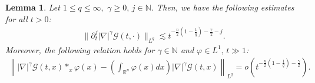 \documentclass[11pt,reqno]{amsart}
\newtheorem{lemma}{Lemma}[section]
\begin{document}
\begin{lemma}\label{Lemma3.2}
    Let $1 \leq q \leq \infty,\,\, \gamma \geq 0,\, j \in \mathbb{N}$. Then, we have the following estimates for all $t > 0$:
        \begin{align}
        \|\partial_t^j |\nabla|^\gamma \mathcal{G}(t,\cdot)\|_{L^q} \lesssim t^{-\frac{n}{2}(1-\frac{1}{q})-\frac{\gamma}{2}-j}. \label{Es.of.lemm3.2}
    \end{align}
    Moreover, the following relation holds for $\gamma \in \mathbb{N}$ and $\varphi \in L^1, \,t \gg 1$:
    \begin{align}
        \left\||\nabla|^{\gamma}\mathcal{G}(t,x) \ast_x \varphi(x)- \left(\int_{\mathbb{R}^n} \varphi(x) dx\right) |\nabla|^{\gamma} \mathcal{G}(t,x)\right\|_{L^q} = o(t^{-\frac{n}{2}(1-\frac{1}{q})-\frac{\gamma}{2}}). \label{Re.of.lemma3.2}
    \end{align}
\end{lemma}
\end{document}
